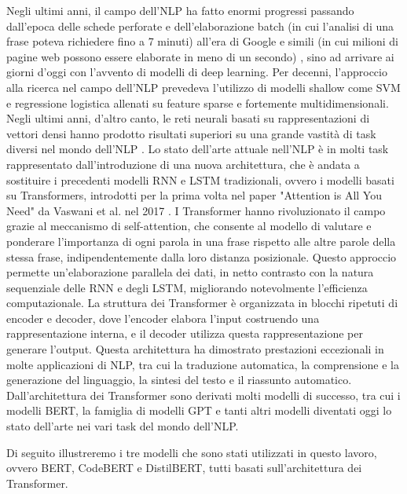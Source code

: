 \documentclass[../../Thesis.tex]{subfiles}
\begin{document}
Negli ultimi  anni, il campo dell'NLP ha fatto enormi progressi passando dall'epoca delle schede perforate e dell'elaborazione batch (in cui l'analisi di una frase poteva richiedere fino a 7 minuti) all'era di Google e simili (in cui milioni di pagine web possono essere elaborate in meno di un secondo) \cite{6786458}, sino ad arrivare ai giorni d'oggi con l'avvento di modelli di deep learning. Per decenni, l'approccio alla ricerca nel campo dell'NLP prevedeva l'utilizzo di modelli shallow come SVM \cite{SVM} e regressione logistica \cite{logisticReg} allenati su feature sparse e fortemente multidimensionali. Negli ultimi anni, d'altro canto,  le reti neurali basati su rappresentazioni di vettori densi hanno prodotto risultati superiori su una grande vastità di task diversi nel mondo dell'NLP \cite{TrendsInNLP}. 
Lo stato dell'arte attuale nell'NLP è in molti task rappresentato dall'introduzione di una nuova architettura, che è andata a sostituire i precedenti modelli  RNN e LSTM \cite{LSTM} tradizionali, ovvero i modelli basati su Transformers, introdotti per la prima volta nel paper "Attention is All You Need" da Vaswani et al. nel 2017 \cite{AttentionIsAllYouNeed}. I Transformer hanno rivoluzionato il campo grazie al meccanismo di self-attention, che consente al modello di valutare e ponderare l'importanza di ogni parola in una frase rispetto alle altre parole della stessa frase, indipendentemente dalla loro distanza posizionale. Questo approccio permette un'elaborazione parallela dei dati, in netto contrasto con la natura sequenziale delle RNN e degli LSTM, migliorando notevolmente l'efficienza computazionale. La struttura dei Transformer è organizzata in blocchi ripetuti di encoder e decoder, dove l'encoder elabora l'input costruendo una rappresentazione interna, e il decoder utilizza questa rappresentazione per generare l'output. Questa architettura ha dimostrato prestazioni eccezionali in molte applicazioni di NLP, tra cui la traduzione automatica, la comprensione e la generazione del linguaggio, la sintesi del testo e il riassunto automatico. Dall'architettura dei Transformer sono derivati molti modelli di successo, tra cui i modelli BERT, la famiglia di modelli GPT e tanti altri modelli diventati oggi lo stato dell'arte nei vari task del mondo dell'NLP. 

Di seguito illustreremo i tre modelli che sono stati utilizzati in questo lavoro, ovvero BERT, CodeBERT e DistilBERT, tutti basati sull'architettura dei Transformer.
\end{document}
